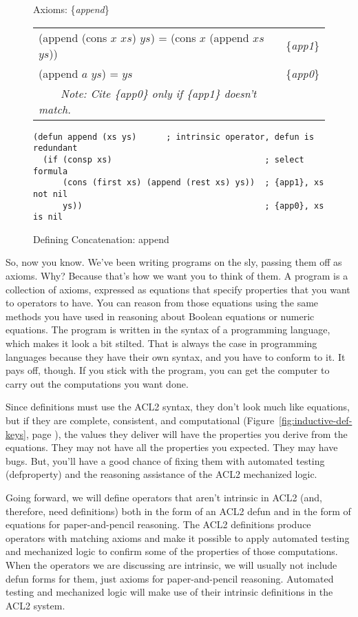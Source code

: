 \begin{figure}
\begin{center}
Axioms: \{\emph{append}\} \\
\begin{tabular}{ll}
(append (cons $x$ $xs$) $ys$) = (cons $x$ (append $xs$ $ys$)) & \{\emph{app1}\} \\
(append $a$ $ys$) =  $ys$                                     & \{\emph{app0}\} \\
~~~~\emph{Note: Cite \{\emph{app0}\} only if \{\emph{app1}\} doesn't match.}&\\
\end{tabular}
\begin{Verbatim}
(defun append (xs ys)      ; intrinsic operator, defun is redundant
  (if (consp xs)                               ; select formula
      (cons (first xs) (append (rest xs) ys))  ; {app1}, xs not nil
      ys))                                     ; {app0}, xs is nil
\end{Verbatim}
\end{center}
\caption{Defining Concatenation: append}
\label{fig:append-defun}
\end{figure}

So, now you know. We've been writing programs on the sly,
passing them off as axioms.
Why? Because that's how we want you to think of them.
A program is a collection of axioms, expressed as equations
that specify properties that you want to operators to have.
You can reason from those equations using the same methods
you have used in reasoning about Boolean equations or numeric equations.
The program is written in the syntax of a programming language,
which makes it look a bit stilted.
That is always the case in programming languages because
they have their own syntax, and you have to conform to it.
It pays off, though.
If you stick with the program, you can get the computer to carry out
the computations you want done.

Since definitions must use the ACL2 syntax,
they don't look much like equations,
but if they are complete, consistent, and computational
(Figure~\ref{fig:inductive-def-keys}, page \pageref{fig:inductive-def-keys}),
the values they deliver will have the properties you derive
from the equations.
They may not have all the properties you expected.
They may have bugs.
But, you'll have a good chance of fixing them with
automated testing (defproperty)
and the reasoning assistance of the ACL2 mechanized logic.

Going forward, we will define operators that aren't
intrinsic in ACL2 (and, therefore, need definitions)
both in the form of an ACL2 defun
and in the form of equations for paper-and-pencil reasoning.
The ACL2 definitions produce operators with matching axioms and
make it possible to apply automated testing and mechanized logic
to confirm some of the properties of those computations.
When the operators we are discussing are intrinsic,
we will usually not include defun forms for them,
just axioms for paper-and-pencil reasoning.
Automated testing and mechanized logic will make use
of their intrinsic definitions in the ACL2 system.

